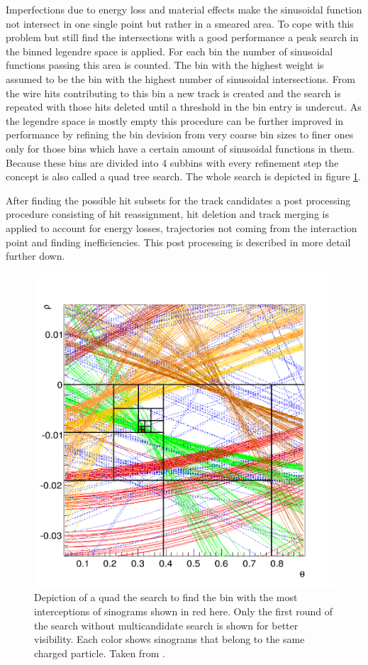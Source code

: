 Imperfections due to energy loss and material effects make the sinusoidal function not intersect in one single point but rather in a smeared area. To cope with this problem but still find the intersections with a good performance a peak search in the binned legendre space is applied. For each bin the number of sinusoidal functions passing this area is counted. The bin with the highest weight is assumed to be the bin with the highest number of sinusoidal intersections. From the wire hits contributing to this bin a new track is created and the search is repeated with those hits deleted until a threshold in the bin entry is undercut. As the legendre space is mostly empty this procedure can be further improved in performance by refining the bin devision from very coarse bin sizes to finer ones only for those bins which have a certain amount of sinusoidal functions in them. Because these bins are divided into 4 subbins with every refinement step the concept is also called a quad tree search. The whole search is depicted in figure \ref{fig-quad-tree-search}.

After finding the possible hit subsets for the track candidates a post processing procedure consisting of hit reassignment, hit deletion and track merging is applied to account for energy losses, trajectories not coming from the interaction point and finding inefficiencies. This post processing is described in more detail further down.

\begin{figure}
  \centering
  \includegraphics[width=0.6\linewidth]{figures/theory/quad_tree.png}
  \caption{Depiction of a quad the search to find the bin with the most interceptions of sinograms shown in red here. Only the first round of the search without multicandidate search is shown for better visibility. Each color shows sinograms that belong to the same charged particle. Taken from \cite{viktor_dpg}.}
  \label{fig-quad-tree-search}
\end{figure}


